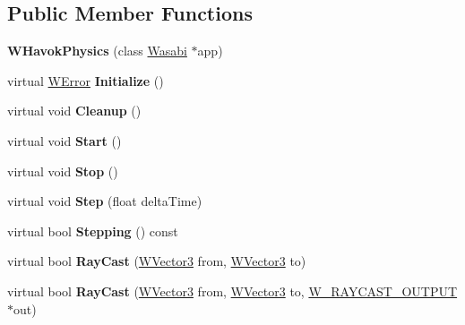 \subsection*{Public Member Functions}
\begin{DoxyCompactItemize}
\item 
{\bfseries W\+Havok\+Physics} (class \hyperlink{class_wasabi}{Wasabi} $\ast$app)\hypertarget{class_w_havok_physics_a93f39b8b7fb90aa15931095f36e8bd6f}{}\label{class_w_havok_physics_a93f39b8b7fb90aa15931095f36e8bd6f}

\item 
virtual \hyperlink{class_w_error}{W\+Error} {\bfseries Initialize} ()\hypertarget{class_w_havok_physics_a15ecfddee3f656b2c5b6363490207d42}{}\label{class_w_havok_physics_a15ecfddee3f656b2c5b6363490207d42}

\item 
virtual void {\bfseries Cleanup} ()\hypertarget{class_w_havok_physics_ad6f54f99bd16ec14cf605453050eb393}{}\label{class_w_havok_physics_ad6f54f99bd16ec14cf605453050eb393}

\item 
virtual void {\bfseries Start} ()\hypertarget{class_w_havok_physics_a39da923d35db5f5489601d034027a3db}{}\label{class_w_havok_physics_a39da923d35db5f5489601d034027a3db}

\item 
virtual void {\bfseries Stop} ()\hypertarget{class_w_havok_physics_a0f95216fddd7cde8fcda6e61ff6c1a10}{}\label{class_w_havok_physics_a0f95216fddd7cde8fcda6e61ff6c1a10}

\item 
virtual void {\bfseries Step} (float delta\+Time)\hypertarget{class_w_havok_physics_a8fde3cd7224124fda0ee7d7116e648ff}{}\label{class_w_havok_physics_a8fde3cd7224124fda0ee7d7116e648ff}

\item 
virtual bool {\bfseries Stepping} () const \hypertarget{class_w_havok_physics_ab5694d9003c22085d878c450b153db61}{}\label{class_w_havok_physics_ab5694d9003c22085d878c450b153db61}

\item 
virtual bool {\bfseries Ray\+Cast} (\hyperlink{class_w_vector3}{W\+Vector3} from, \hyperlink{class_w_vector3}{W\+Vector3} to)\hypertarget{class_w_havok_physics_a335c6db2586bc6a7c2280f7337cec2f9}{}\label{class_w_havok_physics_a335c6db2586bc6a7c2280f7337cec2f9}

\item 
virtual bool {\bfseries Ray\+Cast} (\hyperlink{class_w_vector3}{W\+Vector3} from, \hyperlink{class_w_vector3}{W\+Vector3} to, \hyperlink{struct_w___r_a_y_c_a_s_t___o_u_t_p_u_t}{W\+\_\+\+R\+A\+Y\+C\+A\+S\+T\+\_\+\+O\+U\+T\+P\+UT} $\ast$out)\hypertarget{class_w_havok_physics_aaa01713dc77f9994915a2c1509b9795c}{}\label{class_w_havok_physics_aaa01713dc77f9994915a2c1509b9795c}


\end{DoxyCompactItemize}
